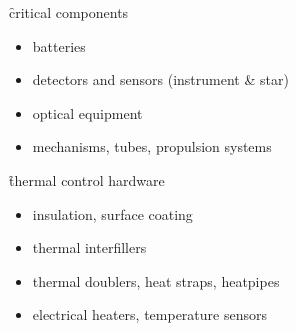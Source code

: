 \f{critical components}
\begin{itemize}
 \item batteries
 \item detectors and sensors (instrument \& star)
 \item optical equipment
 \item mechanisms, tubes, propulsion systems
\end{itemize}

\f{thermal control hardware}
\begin{itemize}
 \item insulation, surface coating
 \item thermal interfillers
 \item thermal doublers, heat straps, heatpipes
 \item electrical heaters, temperature sensors
\end{itemize}





